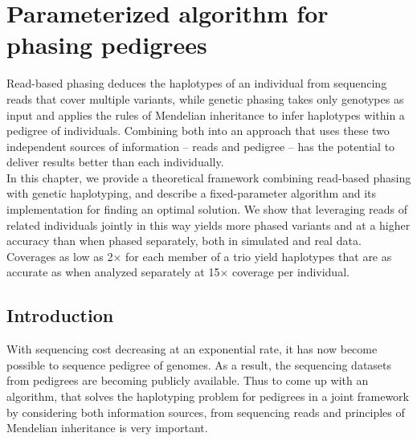 \chapter{Parameterized algorithm for phasing pedigrees}
Read-based phasing deduces the haplotypes of an individual from sequencing reads that cover multiple variants, while genetic phasing takes only genotypes as input and applies the rules of Mendelian inheritance to infer haplotypes within a pedigree of individuals.
Combining both into an approach that uses these two independent sources of information -- reads and pedigree -- has the potential to deliver results better than each individually.\\

In this chapter, we provide a theoretical framework combining read-based phasing with genetic haplotyping, and describe a fixed-parameter algorithm and its implementation for finding an optimal solution.
We show that leveraging reads of related individuals jointly in this way yields more phased variants and at a higher accuracy than when phased separately, both in simulated and real data.
Coverages as low as 2$\times$ for each member of a trio yield haplotypes that are as accurate as when analyzed separately at 15$\times$ coverage per individual.

\section{Introduction}\label{sec:intro}
With sequencing cost decreasing at an exponential rate, it has now become possible to sequence pedigree of genomes.
As a result, the sequencing datasets from pedigrees are becoming publicly available.
Thus to come up with an algorithm, that solves the haplotyping problem for pedigrees in a joint framework by considering both information sources, from sequencing reads and principles of Mendelian inheritance is very important.

